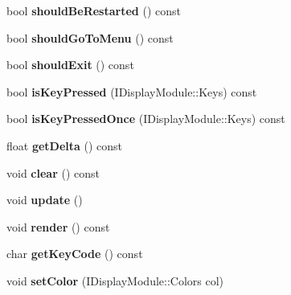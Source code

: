 \begin{DoxyCompactItemize}
\mbox{\label{class_libcaca_module_a7695a5c51039be07f9ae8f7d9299af8c}} 
bool {\bfseries should\+Be\+Restarted} () const
\item 
\mbox{\label{class_libcaca_module_a4d0fd12adf1ece5c77c2da0879d6983b}} 
bool {\bfseries should\+Go\+To\+Menu} () const
\item 
\mbox{\label{class_libcaca_module_a625a8aad9cfa68a42f1b29f871935438}} 
bool {\bfseries should\+Exit} () const
\item 
\mbox{\label{class_libcaca_module_a2a65e4d22b0ec731255105f463ed2b8d}} 
bool {\bfseries is\+Key\+Pressed} (I\+Display\+Module\+::\+Keys) const
\item 
\mbox{\label{class_libcaca_module_a24aeff3733e4c5a57ae7584f13999afb}} 
bool {\bfseries is\+Key\+Pressed\+Once} (I\+Display\+Module\+::\+Keys) const
\item 
\mbox{\label{class_libcaca_module_ab23b12e61cda7274770b1150bb81c9a5}} 
float {\bfseries get\+Delta} () const
\item 
\mbox{\label{class_libcaca_module_a91f065d96ebb4b5cae0ee7f7a7434d13}} 
void {\bfseries clear} () const
\item 
\mbox{\label{class_libcaca_module_af558204179573fc8eda4aa0c5bbc8b71}} 
void {\bfseries update} ()
\item 
\mbox{\label{class_libcaca_module_ad1361bd52611252ec16b957eef3ed78c}} 
void {\bfseries render} () const
\item 
\mbox{\label{class_libcaca_module_ab7bab7d667860fa712e91b35e8052e5b}} 
char {\bfseries get\+Key\+Code} () const
\item 
\mbox{\label{class_libcaca_module_af18274ad399c59acdcdb20ad84d1da04}} 
void {\bfseries set\+Color} (I\+Display\+Module\+::\+Colors col)
\item 
\mbox{\label{class_libcaca_module_a893c088ef10ec0b61606627d42114451}} 

\end{DoxyCompactItemize}
